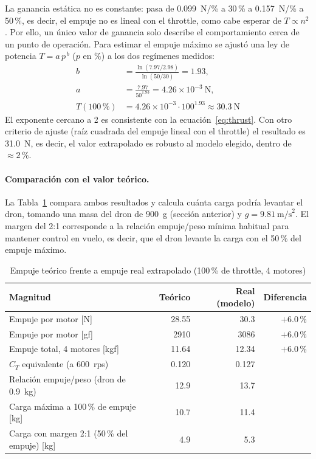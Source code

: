 \documentclass[12pt, letterpaper]{report}
\begin{document}
La ganancia estática no es constante: pasa de 0.099~N/\% a 30\,\% a 0.157~N/\% a 50\,\%, es decir, el empuje no es lineal con el throttle, como cabe esperar de $T \propto n^{2}$. Por ello, un único valor de ganancia solo describe el comportamiento cerca de un punto de operación. Para estimar el empuje máximo se ajustó una ley de potencia $T = a\,p^{\,b}$ ($p$ en \%) a los dos regímenes medidos:
\begin{align*}
b &= \frac{\ln(7.97/2.98)}{\ln(50/30)} = 1.93, \\
a &= \frac{7.97}{50^{1.93}} = 4.26\times10^{-3}\ \text{N}, \\
T(100\,\text{\%}) &= 4.26\times10^{-3}\cdot 100^{1.93} \approx 30.3\ \text{N}
\end{align*}
El exponente cercano a 2 es consistente con la ecuación~\eqref{eq:thrust}. Con otro criterio de ajuste (raíz cuadrada del empuje lineal con el throttle) el resultado es 31.0~N, es decir, el valor extrapolado es robusto al modelo elegido, dentro de $\approx 2\,\text{\%}$.

\paragraph{Comparación con el valor teórico.} La Tabla~\ref{tab:comparacion_empuje} compara ambos resultados y calcula cuánta carga podría levantar el dron, tomando una masa del dron de \SI{900}{\gram} (sección anterior) y $g = 9.81~\text{m/s}^2$. El margen del 2:1 corresponde a la relación empuje/peso mínima habitual para mantener control en vuelo, es decir, que el dron levante la carga con el 50\,\% del empuje máximo.

\begin{table}[htbp]
\centering
\caption{Empuje teórico frente a empuje real extrapolado (100\,\% de throttle, 4 motores)}
\label{tab:comparacion_empuje}
\renewcommand{\arraystretch}{1.3}
\small
\begin{tabular}{@{}l r r r@{}}
\toprule
\rowcolor{gray!20}
\textbf{Magnitud} & \textbf{Teórico} & \textbf{Real (modelo)} & \textbf{Diferencia} \\
\midrule
Empuje por motor [N] & 28.55 & 30.3 & $+6.0\,\text{\%}$ \\
Empuje por motor [gf] & 2910 & 3086 & $+6.0\,\text{\%}$ \\
Empuje total, 4 motores [kgf] & 11.64 & 12.34 & $+6.0\,\text{\%}$ \\
$C_T$ equivalente (a 600~rps) & 0.120 & 0.127 & \\
Relación empuje/peso (dron de 0.9~kg) & 12.9 & 13.7 & \\
Carga máxima a 100\,\% de empuje [kg] & 10.7 & 11.4 & \\
Carga con margen 2:1 (50\,\% del empuje) [kg] & 4.9 & 5.3 & \\
\bottomrule
\end{tabular}
\end{table}
\end{document}
